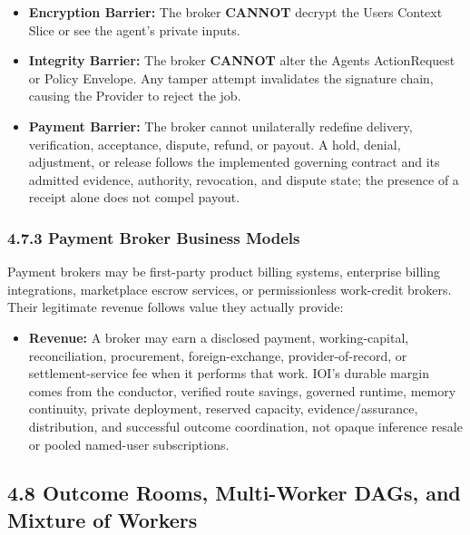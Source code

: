 \documentclass[
  11pt,
]{article}
\providecommand{\tightlist}{%
  \setlength{\itemsep}{0pt}\setlength{\parskip}{0pt}}
\begin{document}
\begin{itemize}
\tightlist
\item
  \textbf{Encryption Barrier:} The broker \textbf{CANNOT} decrypt the
  User\textquotesingle s Context Slice or see the agent's private
  inputs.
\item
  \textbf{Integrity Barrier:} The broker \textbf{CANNOT} alter the
  Agent\textquotesingle s ActionRequest or Policy Envelope. Any tamper
  attempt invalidates the signature chain, causing the Provider to
  reject the job.
\item
  \textbf{Payment Barrier:} The broker cannot unilaterally redefine
  delivery, verification, acceptance, dispute, refund, or payout. A hold,
  denial, adjustment, or release follows the implemented governing
  contract and its admitted evidence, authority, revocation, and dispute
  state; the presence of a receipt alone does not compel payout.
\end{itemize}

\hypertarget{payment-broker-business-models}{%
\subsubsection{4.7.3 Payment Broker Business
Models}\label{payment-broker-business-models}}

Payment brokers may be first-party product billing systems, enterprise
billing integrations, marketplace escrow services, or permissionless
work-credit brokers. Their legitimate revenue follows value they actually
provide:

\begin{itemize}
\tightlist
\item
  \textbf{Revenue:} A broker may earn a disclosed payment, working-capital,
  reconciliation, procurement, foreign-exchange, provider-of-record, or
  settlement-service fee when it performs that work. IOI's durable margin
  comes from the conductor, verified route savings, governed runtime,
  memory continuity, private deployment, reserved capacity,
  evidence/assurance, distribution, and successful outcome coordination,
  not opaque inference resale or pooled named-user subscriptions.
\end{itemize}

\hypertarget{outcome-rooms-multi-worker-dags-and-mixture-of-workers}{%
\subsection{4.8 Outcome Rooms, Multi-Worker DAGs, and Mixture of
Workers}\label{outcome-rooms-multi-worker-dags-and-mixture-of-workers}}
\end{document}
